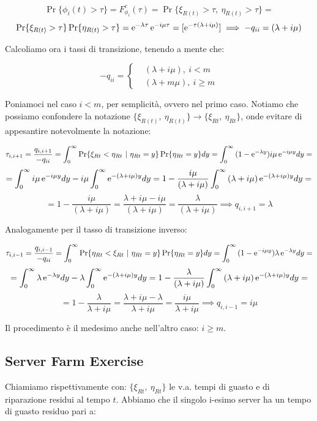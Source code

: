 \[
	\Pr\{\phi_i(t)>\tau\} = F_{\phi_i}^c(\tau) = \Pr\{\xi_{R(t)}>\tau,\ \eta_{R(t)}>\tau\} =
\]
\[
	\Pr\{\xi_{R(t)}>\tau\}\Pr\{\eta_{R(t)}>\tau\} = \mathop{}\!\mathrm{e}^{-\lambda\tau}\mathop{}\!\mathrm{e}^{-i\mu\tau} = [\mathop{}\!\mathrm{e}^{-\tau(\lambda+i\mu)}] \implies -q_{ii}=(\lambda+i\mu)
\]

Calcoliamo ora i tassi di transizione, tenendo a mente che:

\[
	-q_{ii} = \left\{
	\begin{aligned}
	&(\lambda+i\mu),\ i< m\\
	&(\lambda+m\mu),\ i\geq m
	\end{aligned}
	\right.
\]

Poniamoci nel caso $i<m$, per semplicità, ovvero nel primo caso. Notiamo che possiamo confondere la notazione $\{\xi_{R(t)},\ \eta_{R(t)}\}\rightarrow \{\xi_{Rt},\ \eta_{Rt}\}$, onde evitare di appesantire notevolmente la notazione:

\[
	\tau_{i,i+1} = \frac{q_{i,i+1}}{-q_{ii}} = \int_0^\infty{\Pr\{\xi_{Rt} < \eta_{Rt}\ |\ \eta_{Rt} = y\}\Pr\{\eta_{Rt}=y\}dy} = \int_0^\infty{(1-\mathop{}\!\mathrm{e}^{-\lambda y})i\mu\mathop{}\!\mathrm{e}^{-i\mu y}dy} =
\]
\[
	= \int_0^\infty{i\mu\mathop{}\!\mathrm{e}^{-i\mu y}dy} - i\mu\int_0^\infty{\mathop{}\!\mathrm{e}^{-(\lambda+i\mu)y}dy} = 1-\frac{i\mu}{(\lambda+i\mu)}\int_0^\infty{(\lambda+i\mu)\mathop{}\!\mathrm{e}^{-(\lambda+i\mu)y}dy} =
\]
\[
	= 1-\frac{i\mu}{(\lambda+i\mu)} = \frac{\lambda+i\mu-i\mu}{(\lambda+i\mu)} = \frac{\lambda}{(\lambda+i\mu)} \implies q_{i,i+1} = \lambda
\]

Analogamente per il tasso di transizione inverso:

\[
	\tau_{i,i-1} = \frac{q_{i,i-1}}{-q_{ii}} = \int_0^\infty{\Pr\{\eta_{Rt}<\xi_{Rt}\ |\ \eta_{Rt}=y\}\Pr\{\eta_{Rt}=y\}dy} = \int_0^\infty{(1-\e^{-i\mu y})\lambda\e^{-\lambda y}dy} =
\]
\[
	= \int_0^\infty{\lambda\mathop{}\!\mathrm{e}^{-\lambda y}dy}-\lambda\int_0^\infty{\mathop{}\!\mathrm{e}^{-(\lambda+i\mu)y}dy} = 1-\frac{\lambda}{(\lambda+i\mu)}\int_0^\infty{(\lambda+i\mu)\mathop{}\!\mathrm{e}^{-(\lambda+i\mu)y}dy} =
\]
\[
	= 1-\frac{\lambda}{\lambda+i\mu} = \frac{\lambda+i\mu-\lambda}{\lambda+i\mu} = \frac{i\mu}{\lambda+i\mu} \implies q_{i,i-1} = i\mu 
\]

Il procedimento è il medesimo anche nell'altro caso: $i\geq m$.

\subsection{Server Farm Exercise}

Chiamiamo rispettivamente con: $\{\xi_{Rt},\ \eta_{Rt}\}$ le v.a. tempi di guasto e di riparazione residui al tempo $t$. Abbiamo che il singolo i-esimo server ha un tempo di guasto residuo pari a:

